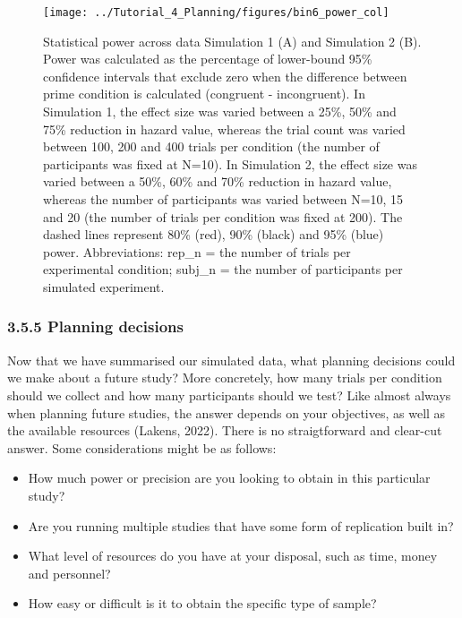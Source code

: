 \documentclass[
  man, donotrepeattitle,floatsintext]{apa6}
\providecommand{\tightlist}{%
  \setlength{\itemsep}{0pt}\setlength{\parskip}{0pt}}
\begin{document}
\begin{figure}[H]

{\centering \texttt{[image: ../Tutorial\_4\_Planning/figures/bin6\_power\_col]} 

}

\caption{Statistical power across data Simulation 1 (A) and Simulation 2 (B). Power was calculated as the percentage of lower-bound 95\% confidence intervals that exclude zero when the difference between prime condition is calculated (congruent - incongruent). In Simulation 1, the effect size was varied between a 25\%, 50\% and 75\% reduction in hazard value, whereas the trial count was varied between 100, 200 and 400 trials per condition (the number of participants was fixed at N=10). In Simulation 2, the effect size was varied between a 50\%, 60\% and 70\% reduction in hazard value, whereas the number of participants was varied between N=10, 15 and 20 (the number of trials per condition was fixed at 200). The dashed lines represent 80\% (red), 90\% (black) and 95\% (blue) power. Abbreviations: rep\_n = the number of trials per experimental condition; subj\_n = the number of participants per simulated experiment.}\label{fig:power}
\end{figure}

\subsubsection{3.5.5 Planning decisions}\label{planning-decisions}

Now that we have summarised our simulated data, what planning decisions could we make about a future study?
More concretely, how many trials per condition should we collect and how many participants should we test?
Like almost always when planning future studies, the answer depends on your objectives, as well as the available resources (Lakens, 2022).
There is no straigtforward and clear-cut answer.
Some considerations might be as follows:

\begin{itemize}
\tightlist
\item
  How much power or precision are you looking to obtain in this particular study?
\item
  Are you running multiple studies that have some form of replication built in?
\item
  What level of resources do you have at your disposal, such as time, money and personnel?
\item
  How easy or difficult is it to obtain the specific type of sample?
\end{itemize}
\end{document}
